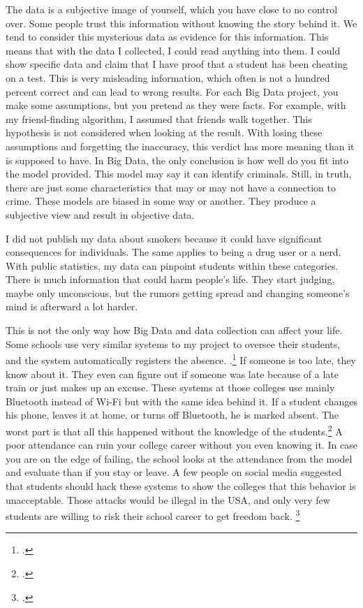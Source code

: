 \documentclass[paper=a4, fontsize=11pt]{article}
\begin{document}
The data is a subjective image of yourself, which you have close to no control over. Some people trust this information without knowing the story behind it. We tend to consider this mysterious data as evidence for this information. This means that with the data I collected, I could read anything into them. I could show specific data and claim that I have proof that a student has been cheating on a test. This is very misleading information, which often is not a hundred percent correct and can lead to wrong results. For each Big Data project, you make some assumptions, but you pretend as they were facts. For example, with my friend-finding algorithm, I assumed that friends walk together. This hypothesis is not considered when looking at the result. With losing these assumptions and forgetting the inaccuracy, this verdict has more meaning than it is supposed to have. In Big Data, the only conclusion is how well do you fit into the model provided. This model may say it can identify criminals. Still, in truth, there are just some characteristics that may or may not have a connection to crime. These models are biased in some way or another. They produce a subjective view and result in objective data.

I did not publish my data about smokers because it could have significant consequences for individuals. The same applies to being a drug user or a nerd. With public statistics, my data can pinpoint students within these categories. There is much information that could harm people's life. They start judging, maybe only unconscious, but the rumors getting spread and changing someone's mind is afterward a lot harder.

This is not the only way how Big Data and data collection can affect your life. Some schools use very similar systems to my project to oversee their students, and the system automatically registers the absence. .\footcite{collegestracking}
 If someone is too late, they know about it. They even can figure out if someone was late because of a late train or just makes up an excuse. These systems at those colleges use mainly Bluetooth instead of Wi-Fi but with the same idea behind it. If a student changes his phone, leaves it at home, or turns off Bluetooth, he is marked absent. The worst part is that all this happened without the knowledge of the students.\footcite{collegestracking} A poor attendance can ruin your college career without you even knowing it. In case you are on the edge of failing, the school looks at the attendance from the model and evaluate than if you stay or leave. A few people on social media suggested that students should hack these systems to show the colleges that this behavior is unacceptable. Those attacks would be illegal in the USA, and only very few students are willing to risk their school career to get freedom back. \footcite{studentrespondonsurveillance}
\end{document}
